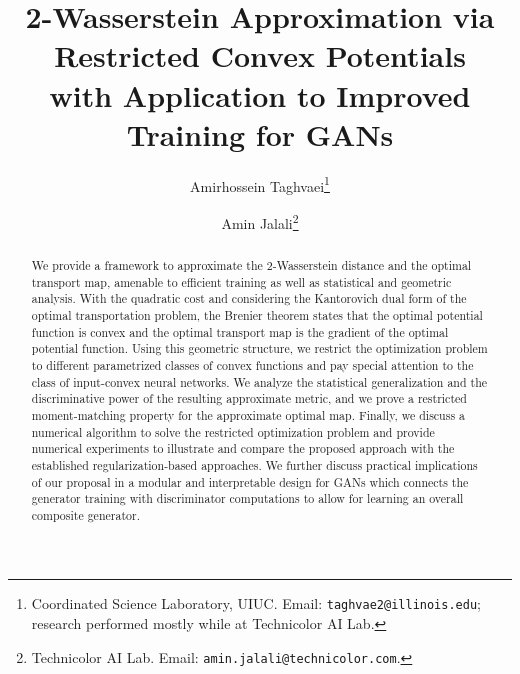 \documentclass[10pt]{article}
\title{2-Wasserstein Approximation via Restricted Convex Potentials\\ with Application to Improved Training for GANs}
\author{Amirhossein Taghvaei\thanks{Coordinated Science Laboratory, UIUC. Email: \texttt{taghvae2@illinois.edu}; 
research performed mostly while at Technicolor AI Lab.} \and Amin Jalali\thanks{Technicolor AI Lab. Email: \texttt{amin.jalali@technicolor.com}.}}
\numberwithin{equation}{section}
\begin{document}
\maketitle


\begin{abstract}
We provide a framework to approximate the 2-Wasserstein distance and the optimal transport map, amenable to efficient training as well as statistical and geometric analysis. With the quadratic cost and considering the Kantorovich dual form of the optimal transportation problem, the Brenier theorem states that the optimal potential function is convex and the optimal transport map is the gradient of the optimal potential function. Using this geometric structure, we restrict the optimization problem to different parametrized classes of convex functions and pay special attention to the class of input-convex neural networks. We analyze the statistical generalization and the discriminative power of the resulting approximate metric, and we prove a restricted moment-matching property for the approximate optimal map. Finally, we discuss a numerical algorithm to solve the restricted optimization problem and provide numerical experiments to illustrate and compare the proposed approach with the established regularization-based approaches. We further discuss practical implications of our proposal in a modular and interpretable design for GANs which connects the generator training with discriminator computations to allow for learning an overall composite generator.
\end{abstract}



\tableofcontents 
\end{document}
